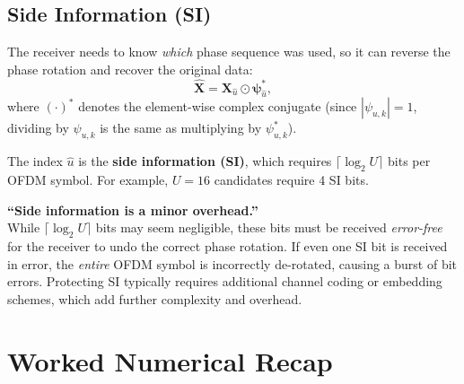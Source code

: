 \subsection{Side Information (SI)}

The receiver needs to know \emph{which} phase sequence was used, so it can
reverse the phase rotation and recover the original data:
\begin{equation*}
    \hat{\bm{X}} = \bm{X}_{\hat{u}} \odot \bm{\psi}_{\hat{u}}^{*},
\end{equation*}
where $(\cdot)^{*}$ denotes the element-wise complex conjugate
(since $|\psi_{u,k}|=1$, dividing by $\psi_{u,k}$ is the same as multiplying
by $\psi_{u,k}^{*}$).

The index $\hat{u}$ is the \textbf{side information (SI)}, which requires
$\lceil\log_2 U\rceil$ bits per OFDM symbol.  For example,
$U=16$ candidates require 4 SI bits.

\begin{misconception}
    \textbf{``Side information is a minor overhead.''} \\
    While $\lceil\log_2 U\rceil$ bits may seem negligible, these bits must be
    received \emph{error-free} for the receiver to undo the correct phase
    rotation.  If even one SI bit is received in error, the \emph{entire}
    OFDM symbol is incorrectly de-rotated, causing a burst of bit errors.
    Protecting SI typically requires additional channel coding or embedding
    schemes, which add further complexity and overhead.
\end{misconception}


\section{Worked Numerical Recap}

